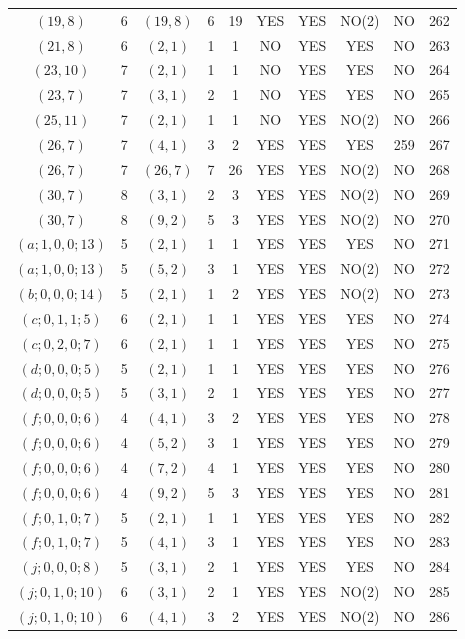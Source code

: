 \begin{longtable}{|c|c|c|c|c|c|c|c|c|c|}
$(19, 8)$ & 6 & $(19, 8)$ & 6 & 19 & YES & YES & NO(2) & NO & 262\\
$(21, 8)$ & 6 & $(2, 1)$ & 1 & 1 & NO & YES & YES & NO & 263\\
$(23, 10)$ & 7 & $(2, 1)$ & 1 & 1 & NO & YES & YES & NO & 264\\
$(23, 7)$ & 7 & $(3, 1)$ & 2 & 1 & NO & YES & YES & NO & 265\\
$(25, 11)$ & 7 & $(2, 1)$ & 1 & 1 & NO & YES & NO(2) & NO & 266\\
$(26, 7)$ & 7 & $(4, 1)$ & 3 & 2 & YES & YES & YES & 259 & 267\\
$(26, 7)$ & 7 & $(26, 7)$ & 7 & 26 & YES & YES & NO(2) & NO & 268\\
$(30, 7)$ & 8 & $(3, 1)$ & 2 & 3 & YES & YES & NO(2) & NO & 269\\
$(30, 7)$ & 8 & $(9, 2)$ & 5 & 3 & YES & YES & NO(2) & NO & 270\\
$(a; 1, 0, 0; 13)$ & 5 & $(2, 1)$ & 1 & 1 & YES & YES & YES & NO & 271\\
$(a; 1, 0, 0; 13)$ & 5 & $(5, 2)$ & 3 & 1 & YES & YES & NO(2) & NO & 272\\
$(b; 0, 0, 0; 14)$ & 5 & $(2, 1)$ & 1 & 2 & YES & YES & NO(2) & NO & 273\\
$(c; 0, 1, 1; 5)$ & 6 & $(2, 1)$ & 1 & 1 & YES & YES & YES & NO & 274\\
$(c; 0, 2, 0; 7)$ & 6 & $(2, 1)$ & 1 & 1 & YES & YES & YES & NO & 275\\
$(d; 0, 0, 0; 5)$ & 5 & $(2, 1)$ & 1 & 1 & YES & YES & YES & NO & 276\\
$(d; 0, 0, 0; 5)$ & 5 & $(3, 1)$ & 2 & 1 & YES & YES & YES & NO & 277\\
$(f; 0, 0, 0; 6)$ & 4 & $(4, 1)$ & 3 & 2 & YES & YES & YES & NO & 278\\
$(f; 0, 0, 0; 6)$ & 4 & $(5, 2)$ & 3 & 1 & YES & YES & YES & NO & 279\\
$(f; 0, 0, 0; 6)$ & 4 & $(7, 2)$ & 4 & 1 & YES & YES & YES & NO & 280\\
$(f; 0, 0, 0; 6)$ & 4 & $(9, 2)$ & 5 & 3 & YES & YES & YES & NO & 281\\
$(f; 0, 1, 0; 7)$ & 5 & $(2, 1)$ & 1 & 1 & YES & YES & YES & NO & 282\\
$(f; 0, 1, 0; 7)$ & 5 & $(4, 1)$ & 3 & 1 & YES & YES & YES & NO & 283\\
$(j; 0, 0, 0; 8)$ & 5 & $(3, 1)$ & 2 & 1 & YES & YES & YES & NO & 284\\
$(j; 0, 1, 0; 10)$ & 6 & $(3, 1)$ & 2 & 1 & YES & YES & NO(2) & NO & 285\\
$(j; 0, 1, 0; 10)$ & 6 & $(4, 1)$ & 3 & 2 & YES & YES & NO(2) & NO & 286
\end{longtable}
